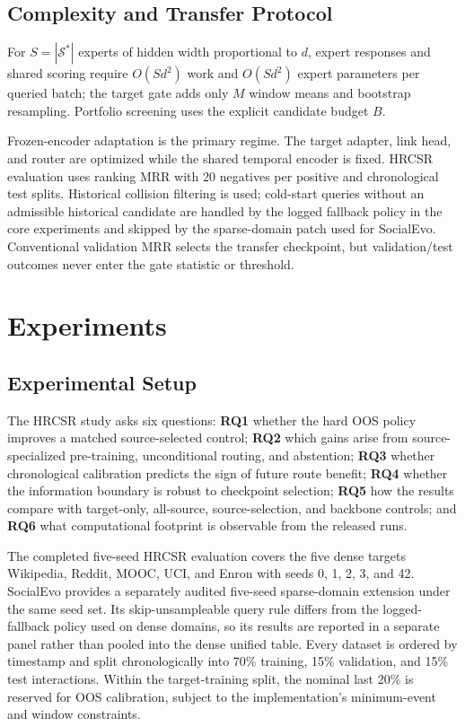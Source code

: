 \documentclass[journal]{IEEEtran}
\begin{document}
\subsection{Complexity and Transfer Protocol}
For $S=|\mathcal S^*|$ experts of hidden width proportional to $d$, expert responses and shared scoring require $O(Sd^2)$ work and $O(Sd^2)$ expert parameters per queried batch; the target gate adds only $M$ window means and bootstrap resampling. Portfolio screening uses the explicit candidate budget $B$.

Frozen-encoder adaptation is the primary regime. The target adapter, link head, and router are optimized while the shared temporal encoder is fixed. HRCSR evaluation uses ranking MRR with 20 negatives per positive and chronological test splits. Historical collision filtering is used; cold-start queries without an admissible historical candidate are handled by the logged fallback policy in the core experiments and skipped by the sparse-domain patch used for SocialEvo. Conventional validation MRR selects the transfer checkpoint, but validation/test outcomes never enter the gate statistic or threshold.

\section{Experiments}
\subsection{Experimental Setup}
The HRCSR study asks six questions: \textbf{RQ1} whether the hard OOS policy improves a matched source-selected control; \textbf{RQ2} which gains arise from source-specialized pre-training, unconditional routing, and abstention; \textbf{RQ3} whether chronological calibration predicts the sign of future route benefit; \textbf{RQ4} whether the information boundary is robust to checkpoint selection; \textbf{RQ5} how the results compare with target-only, all-source, source-selection, and backbone controls; and \textbf{RQ6} what computational footprint is observable from the released runs.

The completed five-seed HRCSR evaluation covers the five dense targets Wikipedia, Reddit, MOOC, UCI, and Enron with seeds 0, 1, 2, 3, and 42. SocialEvo provides a separately audited five-seed sparse-domain extension under the same seed set. Its skip-unsampleable query rule differs from the logged-fallback policy used on dense domains, so its results are reported in a separate panel rather than pooled into the dense unified table. Every dataset is ordered by timestamp and split chronologically into 70\% training, 15\% validation, and 15\% test interactions. Within the target-training split, the nominal last 20\% is reserved for OOS calibration, subject to the implementation's minimum-event and window constraints.
\end{document}
